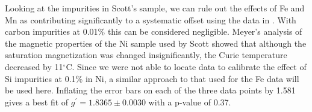 \documentclass[preprint,12pt]{elsarticle}
\begin{document}
Looking at the impurities in Scott's sample, we can rule out the effects of Fe and Mn as contributing significantly to a systematic offset using the data in \cite{Standley1955, Scott1969}. With carbon impurities at 0.01\% this can be considered negligible. Meyer's analysis of the magnetic properties of the Ni sample used by Scott showed that although the saturation magnetization was changed insignificantly, the Curie temperature decreased by 11$^{\circ}$C. Since we were not able to locate data to calibrate the effect of Si impurities at 0.1\% in Ni, a similar approach to that used for the Fe data will be used here. Inflating the error bars on each of the three data points by 1.581 gives a best fit of $g^{\prime}=1.8365\pm$0.0030 with a p-value of 0.37.  

\end{document}
